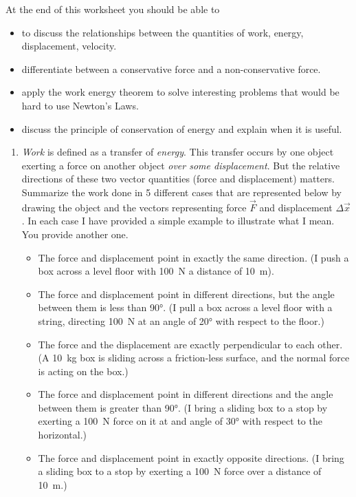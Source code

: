 At the end of this worksheet you should be able to  
\begin{itemize}
	\item to discuss the relationships between the quantities of work, energy, displacement, velocity.
	\item differentiate between a conservative force and a non-conservative force.
	\item apply the work energy theorem to solve interesting problems that would be hard to use Newton's Laws.
	\item discuss the principle of conservation of energy and explain when it is useful.
\end{itemize}


\begin{enumerate}
\setlength\itemsep{1 in}

\item
\emph{Work} is defined as a transfer of \emph{energy}. This transfer occurs by one object exerting a force on another object \emph{over some displacement}. But the relative directions of these two vector quantities (force and displacement) matters. Summarize the work done in 5 different cases that are represented below by drawing the object and the vectors representing force $\vec{F}$ and displacement $\Delta \vec{x}$. In each case I have provided a simple example to illustrate what I mean. You provide another one.
\begin{itemize}
	\setlength\itemsep{1 in}
	\item The force and displacement point in exactly the same direction. (I push a box across a level floor with  \SI{100}{\newton} a distance of \SI{10}{\meter}).
    \item The force and displacement point in different directions, but the angle between them is less than \ang{90}. (I pull a box across a level floor with a string, directing \SI{100}{\newton} at an angle of \ang{20} with respect to the floor.)
    \item The force and the displacement are exactly perpendicular to each other. (A \SI{10}{kg} box is sliding across a friction-less surface, and the normal force is acting on the box.)
    \item The force and displacement point in different directions and the angle between them is greater than \ang{90}. (I bring a sliding box to a stop by exerting a \SI{100}{\newton} force on it at and angle of \ang{30} with respect to the horizontal.)
    \item The force and displacement point in exactly opposite directions. (I bring a sliding box to a stop by exerting a \SI{100}{\newton} force over a distance of \SI{10}{\meter}.)
\end{itemize}


\end{enumerate}
